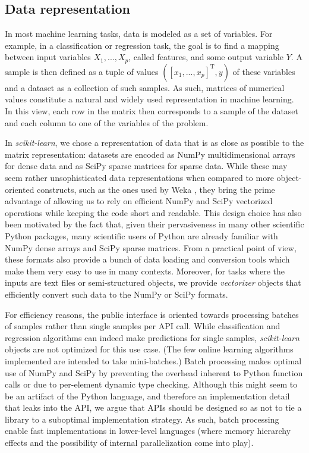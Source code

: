 \documentclass{llncs}
\newcommand{\sklearn}{\textit{scikit-learn}\xspace}
\begin{document}
\subsection{Data representation}
\label{sec:arrays}

In most machine learning tasks, data is modeled as a set of variables.  For
example, in a classification or regression task, the goal is to find a mapping
between input variables $X_1, ..., X_p$, called features, and
some output variable $Y$. A sample is then defined as a tuple of values $([x_1,
..., x_p]^\mathrm{T}, y)$ of these variables and a dataset as a collection of
such samples.  As such, matrices of numerical values constitute a natural and
widely used representation in machine learning. In this view, each row in the
matrix then corresponds to a sample of the dataset and each column to one of the
variables of the problem.

In \sklearn, we chose a representation of data that is as close as
possible to the matrix representation: datasets are encoded as NumPy
multidimensional arrays for dense data and as SciPy sparse matrices for sparse
data. While these may seem rather unsophisticated data representations when
compared to more object-oriented constructs, such as the ones used by
Weka \citep{hall2009weka}, they bring the prime advantage of allowing us to rely
on efficient NumPy and SciPy vectorized operations while keeping
the code short and readable.  This design choice has also been motivated by
the fact that, given their pervasiveness in many other scientific Python
packages, many scientific users of Python are already familiar with NumPy dense
arrays and SciPy sparse matrices.
From a practical point of view, these formats also provide a bunch of
data loading and conversion tools which make them very easy to use in many
contexts. Moreover, for tasks where the inputs are text files or semi-structured
objects, we provide \textit{vectorizer} objects that efficiently convert such
data to the NumPy or SciPy formats.

For efficiency reasons, the public interface is oriented towards processing
batches of samples rather than single samples per API call. While classification
and regression algorithms can indeed make predictions for single samples,
\sklearn objects are not optimized for this use case. (The few online learning
algorithms implemented are intended to take mini-batches.) Batch processing makes
optimal use of NumPy and SciPy by preventing the overhead inherent to Python
function calls or due to per-element dynamic type checking. Although this might
seem to be an artifact of the Python language, and therefore an implementation
detail that leaks into the API, we argue that APIs should be designed so as not
to tie a library to a suboptimal implementation strategy. As such, batch
processing enable fast implementations in lower-level languages (where memory
hierarchy effects and the possibility of internal parallelization come into
play).
\end{document}
